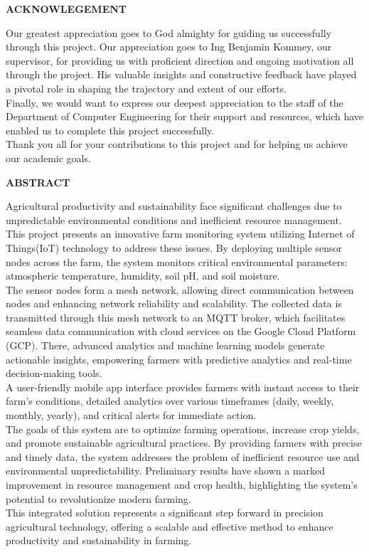 \documentclass[12pt, a4paper]{article}
\begin{document}
\begin{center}
\textbf{ACKNOWLEGEMENT}
\end{center}
Our greatest appreciation goes to God almighty for guiding us successfully through this project. Our appreciation goes to Ing Benjamin Kommey, our supervisor, for providing us with proficient direction and ongoing motivation all through the project. His valuable insights and constructive feedback have played a pivotal role in shaping the trajectory and extent of our efforts.\\
Finally, we would want to express our deepest appreciation to the staff of the Department of Computer Engineering for their support and resources, which have enabled us to complete this project successfully.\\ Thank you all for your contributions to this project and for helping us achieve our academic goals.
\newpage

\begin{center}
\textbf{ABSTRACT}
\end{center}
Agricultural productivity and sustainability face significant challenges due to unpredictable environmental conditions and inefficient resource management. This project presents an innovative farm monitoring system utilizing Internet of Things(IoT) technology to address these issues. By deploying multiple sensor nodes across the farm, the system monitors critical environmental parameters: atmospheric temperature, humidity, soil pH, and soil moisture.\\
The sensor nodes form a mesh network, allowing direct communication between nodes and enhancing network reliability and scalability. The collected data is transmitted through this mesh network to an MQTT broker, which facilitates seamless data communication with cloud services on the Google Cloud Platform (GCP). There, advanced analytics and machine learning models generate actionable insights, empowering farmers with predictive analytics and real-time decision-making tools.\\
A user-friendly mobile app interface provides farmers with instant access to their farm’s conditions, detailed analytics over various timeframes (daily, weekly, monthly, yearly), and critical alerts for immediate action.\\
The goals of this system are to optimize farming operations, increase crop yields, and promote sustainable agricultural practices. By providing farmers with precise and timely data, the system addresses the problem of inefficient resource use and environmental unpredictability. Preliminary results have shown a marked improvement in resource management and crop health, highlighting the system’s potential to revolutionize modern farming.\\
This integrated solution represents a significant step forward in precision agricultural technology, offering a scalable and effective method to enhance productivity and sustainability in farming.
\end{document}
